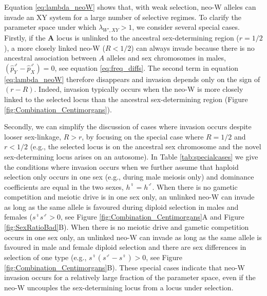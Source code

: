\documentclass[12pt]{article}
\begin{document}
Equation \eqref{eq:lambda_neoW} shows that, with weak selection, neo-W alleles can invade an XY system for a large number of selective regimes. 
To clarify the parameter space under which $\lambda_{W',XY}>1$, we consider several special cases. 
Firstly, if the \textbf{A} locus is unlinked to the ancestral sex-determining region ($r=1/2$), a more closely linked neo-W ($R<1/2$) can always invade because there is no ancestral association between $A$ alleles and sex chromosomes in males, $\left( \hat{p}^\male_Y-\hat{p}^\male_X \right)=0$, see equation \eqref{eq:freq_diffs}. 
The second term in equation \eqref{eq:lambda_neoW} therefore disappears and invasion depends only on the sign of $(r-R)$. 
Indeed, invasion typically occurs when the neo-W is more closely linked to the selected locus than the ancestral sex-determining region (Figure \ref{fig:Combination_Centimorgans}).

Secondly, we can simplify the discussion of cases where invasion occurs despite looser sex-linkage, $R>r$, by focusing on the special case where $R=1/2$ and $r<1/2$ (e.g., the selected locus is on the ancestral sex chromosome and the novel sex-determining locus arises on an autosome). 
In Table \ref{tab:specialcases} we give the conditions where invasion occurs when we further assume that haploid selection only occurs in one sex (e.g., during male meiosis only) and dominance coefficients are equal in the two sexes, $h^\female=h^\male$. 
When there is no gametic competition and meiotic drive is in one sex only, an unlinked neo-W can invade as long as the same allele is favoured during diploid selection in males and females ($s^\female s^\male>0$, see Figure \ref{fig:Combination_Centimorgans}A and Figure \ref{fig:SexRatioBad}B). %
When there is no meiotic drive and gametic competition occurs in one sex only, an unlinked neo-W can invade as long as the same allele is favoured in male and female diploid selection and there are sex differences in selection of one type (e.g., $s^\female(s^\male-s^\female)>0$, see Figure \ref{fig:Combination_Centimorgans}B). %
These special cases indicate that neo-W invasion occurs for a relatively large fraction of the parameter space, even if the neo-W uncouples the sex-determining locus from a locus under selection. 
\end{document}
